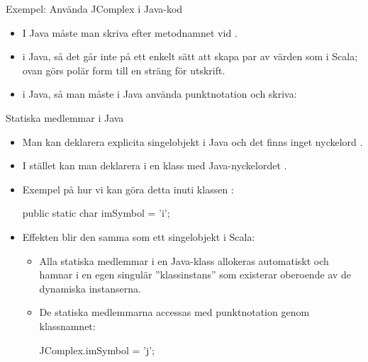 \begin{Slide}{Exempel: Använda JComplex i Java-kod}\SlideFontSmall
{}
\begin{itemize}
\item I Java måste man skriva  efter metodnamnet vid .

\item {} i Java, så det går inte på ett enkelt sätt att skapa par av värden som i Scala; ovan görs polär form till en sträng för utskrift.

\item {} i Java, så man måste i Java använda punktnotation och skriva: 
\end{itemize}
\end{Slide}










\begin{Slide}{Statiska medlemmar i Java}
\begin{itemize}
\item Man kan  deklarera explicita singelobjekt i Java och det finns inget nyckelord .

\item I stället kan man deklarera  i en klass med Java-nyckelordet .

\item Exempel på hur vi kan göra detta inuti klassen :

\begin{Code}[language=Java,basicstyle=\SlideFontSize{10}{12}\ttfamily\selectfont]
    public static char imSymbol = 'i';
\end{Code}

\item Effekten blir den samma som ett singelobjekt i Scala:
\begin{itemize}
\item Alla statiska medlemmar i en Java-klass allokeras automatiskt och hamnar i en egen singulär ''klassinstans'' som existerar oberoende av de dynamiska instanserna.
\item De statiska medlemmarna accessas med punktnotation genom klassnamnet:
\begin{Code}[language=Java,basicstyle=\SlideFontSize{11}{13}\ttfamily\selectfont]
    JComplex.imSymbol = 'j';
\end{Code}

\end{itemize}


\end{itemize}
\end{Slide}



